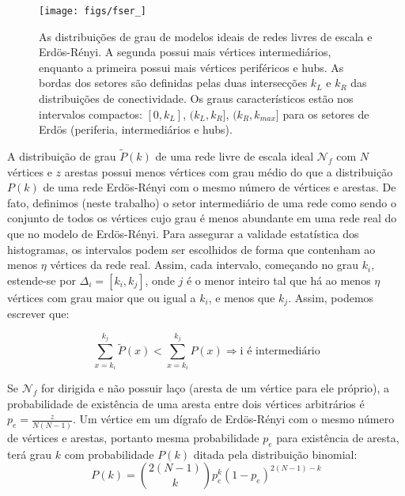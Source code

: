 \documentclass[a4paper,openright,12pt]{report} %
\begin{document}
\begin{figure}[!h]
    \centering
    \caption{ \footnotesize As distribuições de grau de modelos ideais de redes livres de escala e Erdös-Rényi.
        A segunda possui mais vértices intermediários, enquanto a primeira possui mais vértices
        periféricos e hubs. As bordas dos setores são definidas pelas duas intersecções $k_L$
        e $k_R$ das distribuições de conectividade.
        Os graus característicos estão nos intervalos compactos:
                $[0,k_L]$, $(k_L,k_R]$, $(k_R,k_{max}]$
    para os setores de Erdös (periferia, intermediários e hubs).}   
    \texttt{[image: figs/fser\_]}
        \label{fig:setores}
\end{figure}



A distribuição de grau
$\widetilde{P}(k)$
de uma rede livre de escala ideal
$\mathcal{N}_f$ com $N$ 
vértices e $z$ arestas possui menos
vértices com grau médio do que a distribuição $P(k)$
de uma rede Erdös-Rényi com o mesmo número de vértices e arestas.
De fato, definimos (neste trabalho) o setor intermediário de uma
rede como sendo o conjunto de todos os vértices cujo grau é
menos abundante em uma rede real do que no modelo de Erdös-Rényi.
Para assegurar a validade estatística dos histogramas, os intervalos podem
ser escolhidos de forma que contenham ao menos $\eta$ vértices da rede real.
Assim, cada intervalo, começando no grau $k_i$, estende-se por
$\Delta_i=[k_{i},k_{j}]$,
onde $j$ é o menor inteiro tal que há ao menos $\eta$ vértices com grau maior que ou igual a $k_i$,
e menos que $k_j$.
Assim, podemos escrever que:

\begin{equation}\label{criterio2}
    \sum_{x=k_i}^{k_j} \widetilde{P}(x) < \sum_{x=k_i}^{k_j} P(x) \Rightarrow \text{i é intermediário}
\end{equation}

Se $\mathcal{N}_f$ for dirigida e não possuir laço (aresta de um vértice para ele próprio),
a probabilidade
de existência de uma aresta entre dois vértices arbitrários é
$p_e=\frac{z}{N(N-1)}$.
Um vértice em um dígrafo de Erdös-Rényi com o mesmo número de vértices e arestas,
portanto mesma probabilidade
$p_e$
para existência de aresta, terá grau $k$ com probabilidade $P(k)$ ditada pela distribuição binomial:
\begin{equation}
    P(k)=\binom{2(N-1)}{k}p_e^k(1-p_e)^{2(N-1)-k}
\end{equation}
\end{document}
